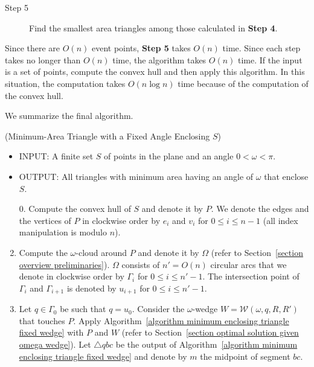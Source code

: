 \documentclass[11pt, oneside]{article}
\def\wedge{\mathcal{W}}
\begin{document}
\begin{description}
\item[Step 5] Find the smallest area triangles among those calculated 
in {\bf Step 4}.
\end{description}

Since there are $O(n)$ event points,
{\bf Step 5} takes $O(n)$ time.
Since each step takes no longer than $O(n)$ time,
the algorithm takes $O(n)$ time.
If the input is a set of points,
compute the convex hull
and then apply this algorithm.
In this situation,
the computation takes $O(n\log n)$ time
because of the computation of the convex hull.

We summarize the final algorithm.
\begin{algorithm}(Minimum-Area Triangle with a Fixed Angle Enclosing $S$)
\label{algorithm minimum enclosing triangle fixed angle}
\begin{itemize}
\item INPUT: A finite set $S$ of points in the plane
and an angle $0<\omega<\pi$.

\item OUTPUT: All triangles with minimum area 
having an angle of $\omega$
that enclose $S$.
\end{itemize}
\begin{enumerate}
\item[0.] Compute the convex hull of $S$ and denote it by $P$.
We denote the edges and the vertices of $P$
in clockwise order 
by $e_i$ and $v_i$ for $0\leq i \leq n-1$
(all index manipulation is modulo $n$).

\item Compute the $\omega$-cloud around $P$
and denote it by $\Omega$
(refer to Section~\ref{section overview preliminaries}).
$\Omega$ consists of $n'=O(n)$ circular arcs
that we denote in clockwise order by $\Gamma_i$ for $0\leq i \leq n'-1$.
The intersection point of $\Gamma_i$ and $\Gamma_{i+1}$ 
is denoted by $u_{i+1}$ for $0\leq i \leq n'-1$.

\item\label{step minimum enclosing triangle fixed omega-wedge}  
Let $q \in \Gamma_0$ be such that $q=u_0$.
Consider the $\omega$-wedge $W=\wedge(\omega,q,R,R')$ 
that touches $P$.
Apply Algorithm~\ref{algorithm minimum enclosing triangle fixed wedge}
with $P$ and $W$
(refer to Section~\ref{section optimal solution given omega wedge}).
Let $\triangle qbc$ be the output 
of Algorithm~\ref{algorithm minimum enclosing triangle fixed wedge}
and denote by $m$ the midpoint of segment $bc$.


\end{enumerate}
\end{algorithm}
\end{document}
